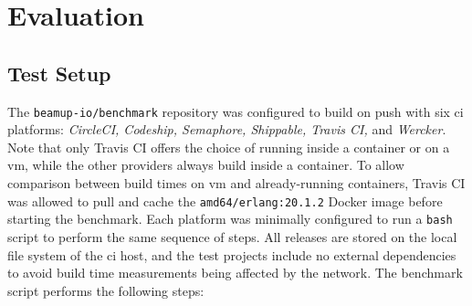 {

\cleardoublepage
\section{Evaluation}


\subsection{Test Setup}
The \lstinline|beamup-io/benchmark| repository was configured to build on push with six \acrshort{ci} platforms: \emph{CircleCI, Codeship, Semaphore, Shippable, Travis CI,} and \emph{Wercker}. Note that only Travis CI offers the choice of running inside a container or on a \acrshort{vm}, while the other providers always build inside a container. To allow comparison between build times on \acrshort{vm} and already-running containers, Travis CI was allowed to pull and cache the \lstinline|amd64/erlang:20.1.2| Docker image before starting the benchmark. Each platform was minimally configured to run a \lstinline|bash| script to perform the same sequence of steps. All releases are stored on the local file system of the \acrshort{ci} host, and the test projects include no external dependencies to avoid build time measurements being affected by the network. The benchmark script performs the following steps:

}
